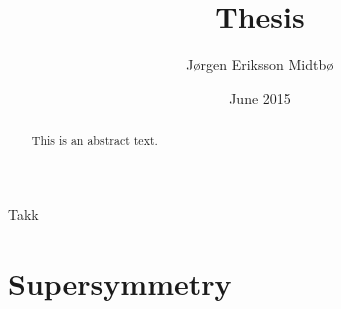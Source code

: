 \documentclass[twoside,english]{uiofysmaster}
\author{J\o rgen Eriksson Midtb\o}
\title{Thesis}
\date{June 2015}
\begin{document}
\lstset{language=Python}


\cleardoublepage

\begin{abstract}
This is an abstract text.
\end{abstract}


\begin{acknowledgements}
  Takk
\end{acknowledgements}

\tableofcontents
\listoffigures
\listoftables


\chapter{Supersymmetry}

\end{document}
